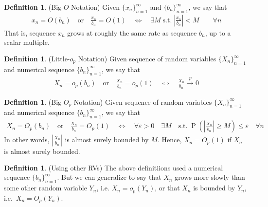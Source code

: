 \documentclass[12pt]{article}
\theoremstyle{plain}
\theoremstyle{definition}
\newtheorem{defn}[thm]{Definition}
\theoremstyle{remark}
\newcommand{\Prb}{\operatorname{P}}
\newcommand{\pto}{\xrightarrow{p}}
\newcommand{\ninf}{_{n=1}^\infty}
\begin{document}
\begin{defn}(Big-$O$ Notation)
Given $\{x_n\}_{n=1}^\infty$ and $\{b_n\}_{n=1}^\infty$, we say that
\begin{align*}
  x_n = O(b_n)
  \quad\text{or} \quad
  \frac{x_n}{b_n} = O(1)
  \quad \iff \quad
  \exists M \; \text{s.t.} \;
  \left\lvert
  \frac{x_n}{b_n}
  \right\rvert
  < M
  \qquad \forall n
\end{align*}
That is, sequence $x_n$ grows at roughly the same rate as sequence
$b_n$, up to a scalar multiple.
\end{defn}

\begin{defn}(Little-$o_p$ Notation)
Given sequence of random variables $\{X_n\}_{n=1}^\infty$ and numerical
sequence $\{b_n\}_{n=1}^\infty$, we say that
\begin{align*}
  X_n = o_p(b_n)
  \quad\text{or} \quad
  \frac{X_n}{b_n} = o_p(1)
  \quad \iff \quad
  \frac{X_n}{b_n} \pto 0
\end{align*}
\end{defn}

\begin{defn}(Big-$O_p$ Notation)
Given sequence of random variables $\{X_n\}_{n=1}^\infty$ and
numerical sequence $\{b_n\}_{n=1}^\infty$, we say that
\begin{align*}
  X_n = O_p(b_n)
  \quad\text{or} \quad
  \frac{X_n}{b_n} = O_p(1)
  \quad \iff \quad
  \forall \varepsilon>0 \quad
  \exists M\quad
  \text{s.t.} \;
  \Prb\left(
  \left\lvert
  \frac{X_n}{b_n}
  \right\rvert
   \geq M\right)
  \leq \varepsilon
  \quad \forall n
\end{align*}
In other words, $\left\lvert\frac{X_n}{b_n}\right\rvert$ is almost surely
bounded by $M$. Hence, $X_n=O_p(1)$ if $X_n$ is almost surely bounded.
\end{defn}

\begin{defn}(Using other RVs)
The above definitiions used a numerical sequence $\{b_n\}\ninf$.
But we can generalize to say that $X_n$ grows more slowly than some
other random variable $Y_n$, i.e. $X_n = o_p(Y_n)$, or that $X_n$ is
bounded by $Y_n$, i.e.\ $X_n=O_p(Y_n)$.
\end{defn}
\end{document}
